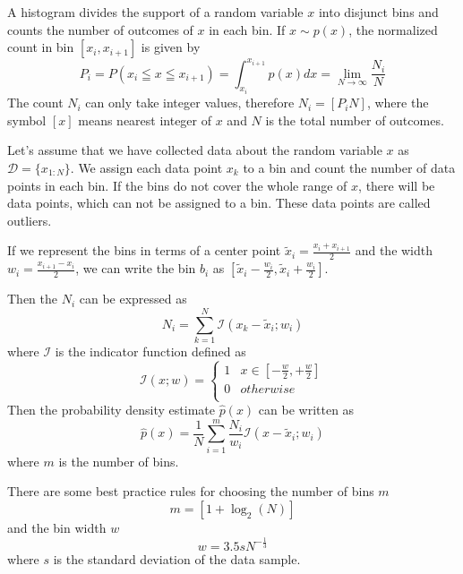 \documentclass{tstextbook}
\begin{document}
A histogram divides the support of a random variable $x$ into disjunct bins and counts the number of outcomes of $x$ in each bin. If $x\sim p(x)$, the normalized count in bin $[x_i,x_{i+1}]$ is given by
  \begin{equation}
    P_i=P\left(x_i\leqq x\leqq x_{i+1}\right)=\int_{x_i}^{x_{i+1}}p(x)dx=\lim_{N\rightarrow\infty}\frac{N_i}{N}
  \end{equation}
The count $N_i$ can only take integer values, therefore $N_i = [P_i N]$, where the symbol $[x]$ means nearest integer of $x$ and $N$ is the total number of outcomes.

Let's assume that we have collected data about the random variable $x$ as $\mathcal{D}=\{x_{1:N}\}$. We assign each data point $x_k$ to a bin and count the number of data points in each bin. If the bins do not cover the whole range of $x$, there will be data points, which can not be assigned to a bin. These data points are called outliers.  

If we represent the bins in terms of a center point $\tilde{x}_i=\frac{x_i + x_{i+1}}{2}$ and the width $w_i=\frac{x_{i+1}-x_i}{2}$, we can write the bin $b_i$ as $[\tilde{x}_i-\frac{w_i}{2},\tilde{x}_i+\frac{w_i}{2}]$.

Then the $N_i$ can be expressed as
  \begin{equation}
    N_i=\sum_{k=1}^{N}\mathcal{I}\left(x_k-\tilde{x}_i;w_i\right)
  \end{equation}
where $\mathcal{I}$ is the indicator function defined as
  \begin{equation}
    \mathcal{I}(x;w)=\begin{cases}1 & x\in [-\frac{w}{2}, +\frac{w}{2}] \\
0 & otherwise \\
\end{cases}
  \end{equation}
Then the probability density estimate $\hat{p}(x)$ can be written as
  \begin{equation}
  \label{eq:probability_density_estimate}
    \hat{p}(x)=\frac{1}{N}\sum_{i=1}^{m}\frac{N_i}{w_i}\mathcal{I}\left(x-\tilde{x}_i;w_i\right)
  \end{equation}
  where $m$ is the number of bins.
  
There are some best practice rules for choosing the number of bins $m$ 
  \begin{equation}
        m = [1 + \log_{2}(N)]
  \end{equation}
and the bin width $w$
  \begin{equation}
        w = 3.5 s N^{-\frac{1}{3}}
  \end{equation}
where $s$ is the standard deviation of the data sample.\\
\end{document}
